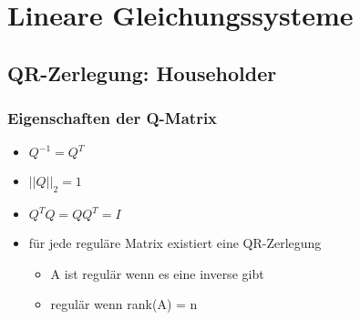 \section{Lineare Gleichungssysteme}

\subsection{QR-Zerlegung: Householder}

\subsubsection*{Eigenschaften der Q-Matrix}
\begin{itemize}

	\item $Q^{-1} = Q^T$
	
	\item $||Q||_2 = 1$
	
	\item $Q^TQ = QQ^T = I$
	
	\item für jede reguläre Matrix existiert eine QR-Zerlegung
	\begin{itemize}
	
		\item A ist regulär wenn es eine inverse gibt
		
		\item regulär wenn rank(A) = n	
	
	\end{itemize}

\end{itemize}

